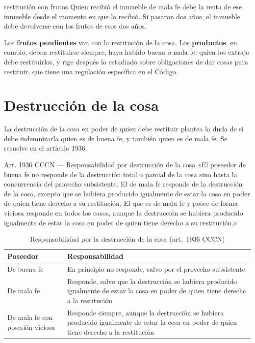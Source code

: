 \documentclass[12pt,oneside]{book}
\begin{document}
\begin{example}{restitución con frutos}
Quien recibió el inmueble de mala fe debe la renta de ese inmueble desde el momento en que lo recibió. Si pasaron dos años, el inmueble debe devolverse con los frutos de esos dos años.
\end{example}

Los \textbf{frutos pendientes} van con la restitución de la cosa. Los \textbf{productos}, en cambio, deben restituirse siempre, haya habido buena o mala fe: quien los extrajo debe restituirlos, y rige después lo estudiado sobre obligaciones de dar cosas para restituir, que tiene una regulación específica en el Código.

\section{Destrucción de la cosa}

La destrucción de la cosa en poder de quien debe restituir plantea la duda de si debe indemnizarla quien es de buena fe, y también quien es de mala fe. Se resuelve en el artículo 1936.

\begin{articulo}{Art. 1936 CCCN --- Responsabilidad por destrucción de la cosa}
«El poseedor de buena fe no responde de la destrucción total o parcial de la cosa sino hasta la concurrencia del provecho subsistente. El de mala fe responde de la destrucción de la cosa, excepto que se hubiera producido igualmente de estar la cosa en poder de quien tiene derecho a su restitución. El que es de mala fe y posee de forma viciosa responde en todos los casos, aunque la destrucción se hubiera producido igualmente de estar la cosa en poder de quien tiene derecho a su restitución.»
\end{articulo}

\begin{table}[H]
\centering
\caption{Responsabilidad por la destrucción de la cosa (art.~1936 CCCN)}
\begin{tabularx}{\textwidth}{
    >{\raggedright\arraybackslash}p{}
    >{\raggedright\arraybackslash}X
}
\toprule
\textbf{Poseedor} & \textbf{Responsabilidad} \\
\midrule
De buena fe & En principio no responde, salvo por el provecho subsistente \\
\addlinespace
De mala fe & Responde, salvo que la destrucción se hubiera producido igualmente de estar la cosa en poder de quien tiene derecho a la restitución \\
\addlinespace
De mala fe con posesión viciosa & Responde siempre, aunque la destrucción se hubiera producido igualmente de estar la cosa en poder de quien tiene derecho a la restitución \\
\bottomrule
\end{tabularx}
\end{table}
\end{document}
